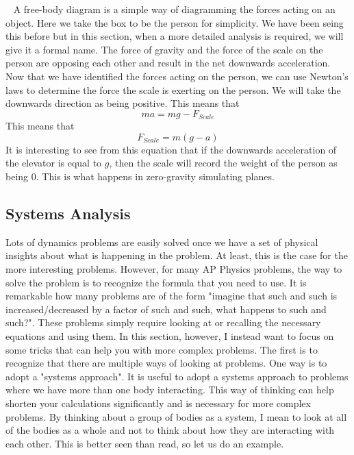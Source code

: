 \documentclass{article}[gray]
\numberwithin{equation}{subsection}
\begin{document}
\
\newline
A free-body diagram is a simple way of diagramming the forces acting on an object. Here we take the box to be the person for simplicity. We have been seing this before but in this section, when a more detailed analysis is required, we will give it a formal name. The force of gravity and the force of the scale on the person are opposing each other and result in the net downwards acceleration. Now that we have identified the forces acting on the person, we can use Newton's laws to determine the force the scale is exerting on the person. We will take the downwards direction as being positive. This means that \begin{equation}ma=mg-F_{Scale}\end{equation} This means that \begin{equation}F_{Scale}=m\left(g-a\right)\end{equation} It is interesting to see from this equation that if the downwards acceleration of the elevator is equal to $g$, then the scale will record the weight of the person as being 0. This is what happens in zero-gravity simulating planes. 


\subsection{Systems Analysis}
Lots of dynamics problems are easily solved once we have a set of physical insights about what is happening in the problem. At least, this is the case for the more interesting problems. However, for many AP Physics problems, the way to solve the problem is to recognize the formula that you need to use. It is remarkable how many problems are of the form "imagine that such and such is increased/decreased by a factor of such and such, what happens to such and such?". These problems simply require looking at or recalling the necessary equations and using them. In this section, however, I instead want to focus on some tricks that can help you with more complex problems. The first is to recognize that there are multiple ways of looking at problems. One way is to adopt a "systems approach". It is useful to adopt a systems approach to problems where we have more than one body interacting. This way of thinking can help shorten your calculations significantly and is necessary for more complex problems. By thinking about a group of bodies as a system, I mean to look at all of the bodies as a whole and not to think  about how they are interacting with each other. This is better seen than read, so let us do an example. 
\end{document}
